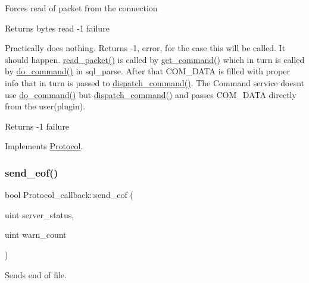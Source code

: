 Forces read of packet from the connection

\begin{DoxyReturn}{Returns}
bytes read -\/1 failure
\end{DoxyReturn}
Practically does nothing. Returns -\/1, error, for the case this will be called. It should happen. \mbox{\hyperlink{classProtocol__callback_a42c79ab20047c154ff73d8d732563928}{read\+\_\+packet()}} is called by \mbox{\hyperlink{classProtocol__callback_a87b4bf121b5c2851ae2948ca0ea02e37}{get\+\_\+command()}} which in turn is called by \mbox{\hyperlink{group__Runtime__Environment_ga331df424a7892fbbad536f0f3a7b18f6}{do\+\_\+command()}} in sql\+\_\+parse. After that C\+O\+M\+\_\+\+D\+A\+TA is filled with proper info that in turn is passed to \mbox{\hyperlink{group__Runtime__Environment_gabf07206792036bfb47e5bb8eb0f20bc4}{dispatch\+\_\+command()}}. The Command service doesn\textquotesingle{}t use \mbox{\hyperlink{group__Runtime__Environment_ga331df424a7892fbbad536f0f3a7b18f6}{do\+\_\+command()}} but \mbox{\hyperlink{group__Runtime__Environment_gabf07206792036bfb47e5bb8eb0f20bc4}{dispatch\+\_\+command()}} and passes C\+O\+M\+\_\+\+D\+A\+TA directly from the user(plugin).

\begin{DoxyReturn}{Returns}
-\/1 failure 
\end{DoxyReturn}


Implements \mbox{\hyperlink{classProtocol_a864cc6313ff0a75ce7a69dd7c89de4a7}{Protocol}}.

\mbox{\label{classProtocol__callback_a67fbe75c90e0c993d5e3e15455fbeb99}} 
\subsubsection{\texorpdfstring{send\+\_\+eof()}{send\_eof()}}
{\footnotesize\ttfamily bool Protocol\+\_\+callback\+::send\+\_\+eof (\begin{DoxyParamCaption}\item[{uint}]{server\+\_\+status,  }\item[{uint}]{warn\+\_\+count }\end{DoxyParamCaption})\hspace{0.3cm}{\ttfamily [virtual]}}

Sends end of file.

